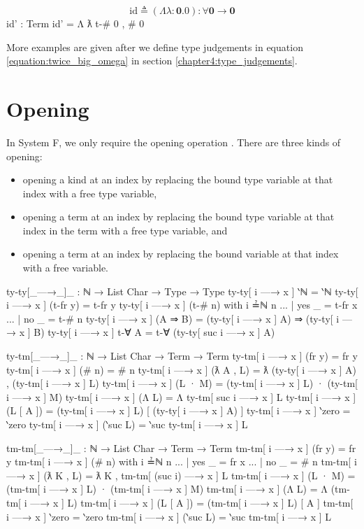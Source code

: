 \documentclass[logo,bsc,singlespacing,parskip,online]{infthesis}
\renewenvironment{code}{\mintedcopy[breaklines,breaksymbolleft=\;]{agda}}{\endmintedcopy}
\begin{document}
\begin{equation*}
  \text{id} \triangleq (\Lambda \lambda \colon \mathbf{0}. 0) \colon \forall \mathbf{0} \to \mathbf{0}
\end{equation*}
\begin{code}
  id' : Term
  id' = Λ ƛ t-# 0 , # 0
\end{code}

More examples are given after we define type judgements in equation \ref{equation:twice_big_omega}
in section \ref{chapter4:type_judgements}.

\section{Opening}
In System F, we only require the opening operation \citep{chargueraud_locally_2012}. There are three
kinds of opening:
\begin{itemize}
  \item opening a kind at an index by replacing the bound type variable at that index with a free
        type variable,
  \item opening a term at an index by replacing the bound type variable at that index in the term
        with a free type variable, and
  \item opening a term at an index by replacing the bound variable at that index with a free
        variable.
\end{itemize}

\begin{code}
  ty-ty[_—→_]_ : ℕ → List Char → Type → Type
  ty-ty[ i —→ x ] ‵ℕ = ‵ℕ
  ty-ty[ i —→ x ] (t-fr y) = t-fr y
  ty-ty[ i —→ x ] (t-# n) with i ≟ℕ n
  ... | yes _ = t-fr x
  ... | no  _ = t-# n
  ty-ty[ i —→ x ] (A ⇒ B) = (ty-ty[ i —→ x ] A) ⇒ (ty-ty[ i —→ x ] B)
  ty-ty[ i —→ x ] t-∀ A = t-∀ (ty-ty[ suc i —→ x ] A)

  ty-tm[_—→_]_ : ℕ → List Char → Term → Term
  ty-tm[ i —→ x ] (fr y) = fr y
  ty-tm[ i —→ x ] (# n) = # n
  ty-tm[ i —→ x ] (ƛ A , L) = ƛ (ty-ty[ i —→ x ] A) , (ty-tm[ i —→ x ] L)
  ty-tm[ i —→ x ] (L · M) = (ty-tm[ i —→ x ] L) · (ty-tm[ i —→ x ] M)
  ty-tm[ i —→ x ] (Λ L) = Λ ty-tm[ suc i —→ x ] L
  ty-tm[ i —→ x ] (L [ A ]) = (ty-tm[ i —→ x ] L) [ (ty-ty[ i —→ x ] A) ]
  ty-tm[ i —→ x ] ‵zero = ‵zero
  ty-tm[ i —→ x ] (‵suc L) = ‵suc ty-tm[ i —→ x ] L

  tm-tm[_—→_]_ : ℕ → List Char → Term → Term
  tm-tm[ i —→ x ] (fr y) = fr y
  tm-tm[ i —→ x ] (# n) with i ≟ℕ n
  ... | yes _ = fr x
  ... | no  _ = # n
  tm-tm[ i —→ x ] (ƛ K , L) = ƛ K , tm-tm[ (suc i) —→ x ] L
  tm-tm[ i —→ x ] (L · M) = (tm-tm[ i —→ x ] L) · (tm-tm[ i —→ x ] M)
  tm-tm[ i —→ x ] (Λ L) = Λ (tm-tm[ i —→ x ] L)
  tm-tm[ i —→ x ] (L [ A ]) = (tm-tm[ i —→ x ] L) [ A ]
  tm-tm[ i —→ x ] ‵zero = ‵zero
  tm-tm[ i —→ x ] (‵suc L) = ‵suc tm-tm[ i —→ x ] L
\end{code}
\end{document}
